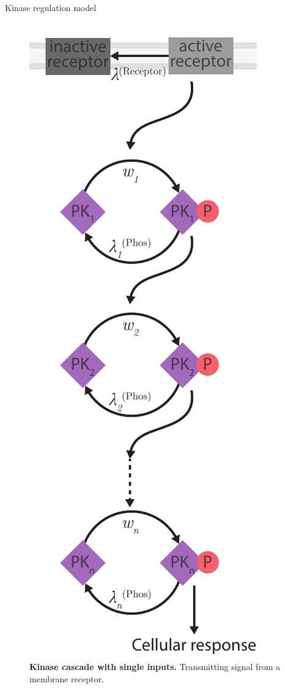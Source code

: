 \begin{frame}{Kinase regulation model}
\begin{columns}
\begin{column}{0.5\textwidth}
\begin{figure}
\begin{minipage}[t]{0.4\textwidth}
\caption{\textbf{Kinase cascade with single inputs.} Transmitting signal from a membrane receptor.}
\end{minipage}
\begin{minipage}[c]{0.37\textwidth}
\includegraphics[width=\textwidth]{theory/fig/kinase_cascade.pdf}

\end{minipage}
\end{figure}
\end{column}
\end{columns}
\end{frame}
